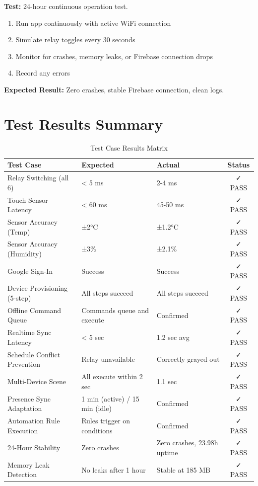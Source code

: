 \textbf{Test:} 24-hour continuous operation test.

\begin{enumerate}
    \item Run app continuously with active WiFi connection
    \item Simulate relay toggles every 30 seconds
    \item Monitor for crashes, memory leaks, or Firebase connection drops
    \item Record any errors
\end{enumerate}

\textbf{Expected Result:} Zero crashes, stable Firebase connection, clean logs.

\section{Test Results Summary}

\begin{table}[H]
\centering
\caption{Test Case Results Matrix}
\label{tbl:test_results}
\begin{tabular}{|p{4.5cm}|p{3.5cm}|p{3.5cm}|c|}
\hline
\textbf{Test Case} & \textbf{Expected} & \textbf{Actual} & \textbf{Status} \\
\hline
Relay Switching (all 6) & < 5 ms & 2-4 ms & ✓ PASS \\
\hline
Touch Sensor Latency & < 60 ms & 45-50 ms & ✓ PASS \\
\hline
Sensor Accuracy (Temp) & ±2°C & ±1.2°C & ✓ PASS \\
\hline
Sensor Accuracy (Humidity) & ±3\% & ±2.1\% & ✓ PASS \\
\hline
Google Sign-In & Success & Success & ✓ PASS \\
\hline
Device Provisioning (5-step) & All steps succeed & All steps succeed & ✓ PASS \\
\hline
Offline Command Queue & Commands queue and execute & Confirmed & ✓ PASS \\
\hline
Realtime Sync Latency & < 5 sec & 1.2 sec avg & ✓ PASS \\
\hline
Schedule Conflict Prevention & Relay unavailable & Correctly grayed out & ✓ PASS \\
\hline
Multi-Device Scene & All execute within 2 sec & 1.1 sec & ✓ PASS \\
\hline
Presence Sync Adaptation & 1 min (active) / 15 min (idle) & Confirmed & ✓ PASS \\
\hline
Automation Rule Execution & Rules trigger on conditions & Confirmed & ✓ PASS \\
\hline
24-Hour Stability & Zero crashes & Zero crashes, 23.98h uptime & ✓ PASS \\
\hline
Memory Leak Detection & No leaks after 1 hour & Stable at 185 MB & ✓ PASS \\
\hline
\end{tabular}
\end{table}

